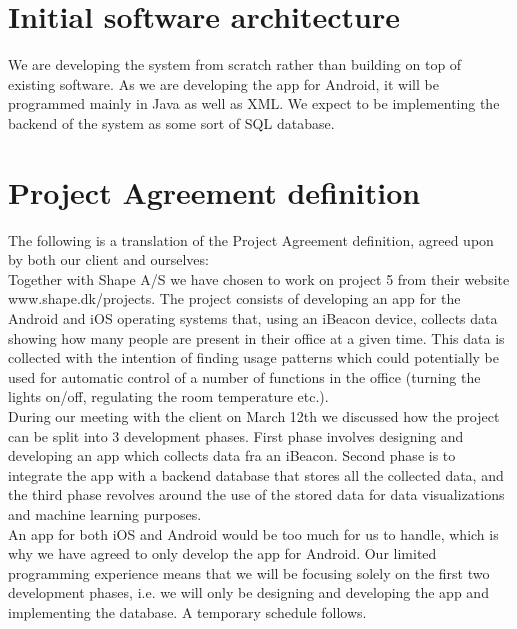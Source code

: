 \documentclass[12pt]{article}
\begin{document}
\section{Initial software architecture}

We are developing the system from scratch rather than building on top of existing software. As we are developing the app for Android, it will be programmed mainly in Java as well as XML. We expect to be implementing the backend of the system as some sort of SQL database.\\










\newpage
\section{Project Agreement definition}

The following is a translation of the Project Agreement definition, agreed upon by both our client and ourselves:\\

Together with Shape A/S we have chosen to work on project 5 from their website www.shape.dk/projects. The project consists of developing an app for the Android and iOS operating systems that, using an iBeacon device, collects data showing how many people are present in their office at a given time. This data is collected with the intention of finding usage patterns which could potentially be used for automatic control of a number of functions in the office (turning the lights on/off, regulating the room temperature etc.).\\

During our meeting with the client on March 12th we discussed how the project can be split into 3 development phases. First phase involves designing and developing an app which collects data fra an iBeacon. Second phase is to integrate the app with a backend database that stores all the collected data, and the third phase revolves around the use of the stored data for data visualizations and machine learning purposes.\\

An app for both iOS and Android would be too much for us to handle, which is why we have agreed to only develop the app for Android. Our limited programming experience means that we will be focusing solely on the first two development phases, i.e. we will only be designing and developing the app and implementing the database. A temporary schedule follows.\\
\end{document}
